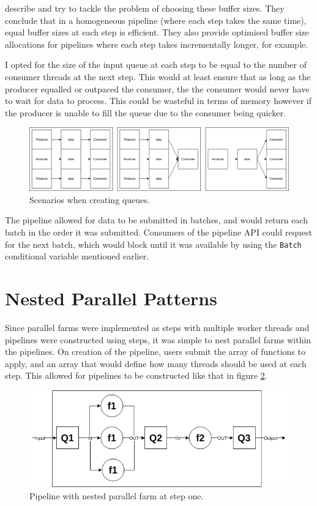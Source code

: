 \documentclass[12pt]{article}
\def\code#1{\texttt{#1}}
\begin{document}
\cite{buffer} describe and try to tackle the problem of choosing these buffer sizes. They conclude that in a homogeneous pipeline (where each step takes the same time), equal buffer sizes at each step is efficient. They also provide optimised buffer size allocations for pipelines where each step takes incrementally longer, for example. 

I opted for the size of the input queue at each step to be equal to the number of consumer threads at the next step. This would at least ensure that as long as the producer equalled or outpaced the consumer, the the consumer would never have to wait for data to process. This could be wasteful in terms of memory however if the producer is unable to fill the queue due to the consumer being quicker.

\begin{figure}[!ht]
	\centering 
	\includegraphics[width=\linewidth]{images/qsize}
	\caption{Scenarios when creating queues.}
	\label{fig:qsize}
\end{figure}

The pipeline allowed for data to be submitted in batches, and would return each batch in the order it was submitted. Consumers of the pipeline API could request for the next batch, which would block until it was available by using the \code{Batch} conditional variable mentioned earlier.

\section{Nested Parallel Patterns}

Since parallel farms were implemented as steps with multiple worker threads and pipelines were constructed using steps, it was simple to nest parallel farms within the pipelines. On creation of the pipeline, users submit the array of functions to apply, and an array that would define how many threads should be used at each step. This allowed for pipelines to be constructed like that in figure \ref{fig:nested}.

\begin{figure}[!ht]
	\centering 
	\includegraphics[width=0.8\linewidth]{images/nested}
	\caption{Pipeline with nested parallel farm at step one.}
	\label{fig:nested}
\end{figure}
\end{document}
